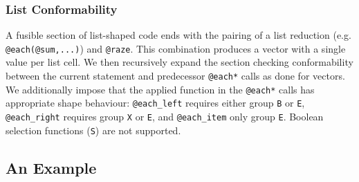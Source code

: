 \subsubsection{List Conformability}

A fusible section of list-shaped code ends with the pairing of a list reduction
(e.g. \texttt{@each(@sum,...)}) and \texttt{@raze}. This combination produces a
vector with a single value per list cell. We then recursively expand the section
checking conformability between the current statement and predecessor \texttt{@each*}
calls as done for vectors. We additionally impose that the applied function in the
\texttt{@each*} calls has appropriate shape behaviour:  \texttt{@each_left} requires
either group \texttt{B} or \texttt{E}, \texttt{@each_right} requires group \texttt{X}
or \texttt{E}, and \texttt{@each_item} only group \texttt{E}. Boolean selection
functions (\texttt{S}) are not supported.

% 


% 
% 

\subsection{An Example}

